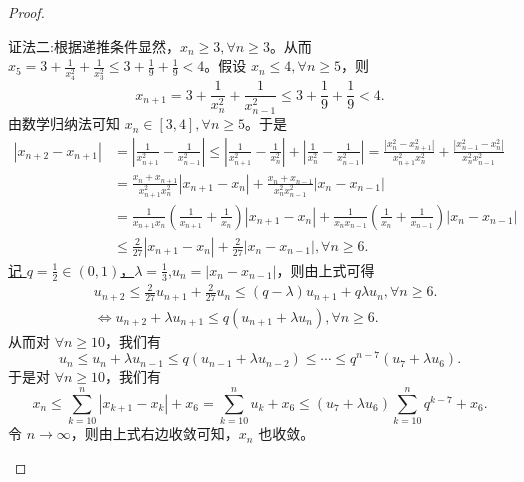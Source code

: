 \documentclass[../../main.tex]{subfiles}%
\begin{document}
\begin{proof}
\begin{enumerate}
{\color{blue}证法二:}根据递推条件显然，\(x_n\geqslant 3,\forall n\geqslant 3\)。从而 \(x_5 = 3+\frac{1}{x_{4}^{2}}+\frac{1}{x_{3}^{2}}\leqslant 3+\frac{1}{9}+\frac{1}{9}<4\)。假设 \(x_n\leqslant 4,\forall n\geqslant 5\)，则
\[
x_{n + 1}=3+\frac{1}{x_{n}^{2}}+\frac{1}{x_{n - 1}^{2}}\leqslant 3+\frac{1}{9}+\frac{1}{9}<4.
\]
由数学归纳法可知 \(x_n\in [3,4],\forall n\geqslant 5\)。于是
\begin{align*}
\left| x_{n+2}-x_{n+1} \right|&=\left| \frac{1}{x_{n+1}^{2}}-\frac{1}{x_{n-1}^{2}} \right|\leqslant \left| \frac{1}{x_{n+1}^{2}}-\frac{1}{x_{n}^{2}} \right|+\left| \frac{1}{x_{n}^{2}}-\frac{1}{x_{n-1}^{2}} \right|=\frac{\left| x_{n}^{2}-x_{n+1}^{2} \right|}{x_{n+1}^{2}x_{n}^{2}}+\frac{\left| x_{n-1}^{2}-x_{n}^{2} \right|}{x_{n}^{2}x_{n-1}^{2}}
\\
&=\frac{x_n+x_{n+1}}{x_{n+1}^{2}x_{n}^{2}}\left| x_{n+1}-x_n \right|+\frac{x_n+x_{n-1}}{x_{n}^{2}x_{n-1}^{2}}\left| x_n-x_{n-1} \right|
\\
&=\frac{1}{x_{n+1}x_n}\left( \frac{1}{x_{n+1}}+\frac{1}{x_n} \right) \left| x_{n+1}-x_n \right|+\frac{1}{x_nx_{n-1}}\left( \frac{1}{x_n}+\frac{1}{x_{n-1}} \right) \left| x_n-x_{n-1} \right|
\\
&\leqslant \frac{2}{27}\left| x_{n+1}-x_n \right|+\frac{2}{27}\left| x_n-x_{n-1} \right|,\forall n\geqslant 6.      
\end{align*}
\hyperlink{取q,lambda的原因}{记 \(q = \frac{1}{2}\in(0,1)\)，\(\lambda=\frac{1}{3}\)},\(u_n = |x_n - x_{n - 1}|\)，则由上式可得
\begin{align*}
&u_{n + 2}\leqslant \frac{2}{27}u_{n + 1}+\frac{2}{27}u_n
\leqslant (q - \lambda)u_{n + 1}+q\lambda u_n,\forall n\geqslant 6.\\
&\iff u_{n + 2}+\lambda u_{n + 1}\leqslant q(u_{n + 1}+\lambda u_n),\forall n\geqslant 6.
\end{align*}
从而对 \(\forall n\geqslant 10\)，我们有
\[
u_n\leqslant u_n+\lambda u_{n - 1}\leqslant q(u_{n - 1}+\lambda u_{n - 2})\leqslant\cdots\leqslant q^{n - 7}(u_7+\lambda u_6).
\]
于是对 \(\forall n\geqslant 10\)，我们有
\[
x_n\leqslant \sum_{k = 10}^n|x_{k + 1}-x_k|+x_6=\sum_{k = 10}^n u_k+x_6\leqslant (u_7+\lambda u_6)\sum_{k = 10}^n q^{k - 7}+x_6.
\]
令 \(n\rightarrow\infty\)，则由上式右边收敛可知，\(x_n\) 也收敛。
\end{enumerate}    

\end{proof}
\end{document}
